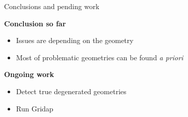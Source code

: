 \documentclass{beamer}
\begin{document}
%  
%
%
%


\begin{frame}{Conclusions and pending work}

  \textbf{Conclusion so far}
  \begin{itemize}
    \item
      Issues are depending on the geometry
    \item
      Most of problematic geometries can be found \textit{a priori}
  \end{itemize}
  \textbf{Ongoing work}
  \begin{itemize}
    \item
      Detect true degenerated geometries
    \item
      Run Gridap
  \end{itemize}


\end{frame}
\end{document}
